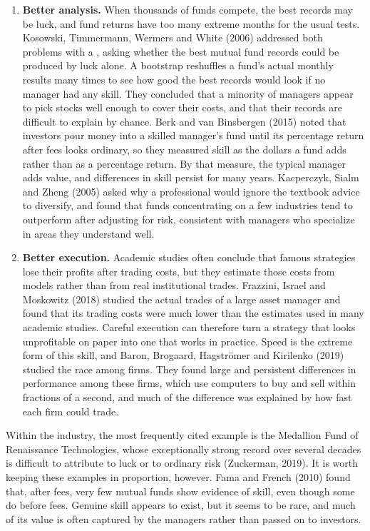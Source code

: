\begin{itemize}
\begin{enumerate}
    \item \textbf{Better analysis.} When thousands of funds compete, the best
  records may be luck, and fund returns have too many extreme months for the
  usual tests. Kosowski, Timmermann, Wermers and White (2006) addressed both
  problems with a , asking whether the best mutual
  fund records could be produced by luck alone. A bootstrap reshuffles a fund's actual monthly
  results many times to see how good the best records would look if no
  manager had any skill. They concluded that a minority of managers appear
  to pick stocks well enough to cover their costs, and that their records are
  difficult to explain by chance. Berk and van Binsbergen (2015) noted that
  investors pour money into a skilled manager's fund until its percentage
  return after fees looks ordinary, so they measured skill as the dollars a
  fund adds rather than as a percentage return. By
  that measure, the typical manager adds value, and differences in skill
  persist for many years. Kacperczyk, Sialm and Zheng (2005) asked why a
  professional would ignore the textbook advice to diversify, and found that
  funds concentrating on a few industries tend to outperform after adjusting for
  risk, consistent with managers who specialize in areas they understand well.

    \item \textbf{Better execution.} Academic studies often conclude that
  famous strategies lose their profits after trading costs, but they estimate
  those costs from models rather than from real institutional trades.
  Frazzini, Israel and Moskowitz (2018) studied the actual trades of a large
  asset manager and found that its trading costs were much lower than the
  estimates used in many academic studies. Careful
  execution can therefore turn a strategy that looks unprofitable on paper
  into one that works in practice. Speed is the extreme form of this
  skill, and Baron, Brogaard, Hagstr\"om{}er and Kirilenko (2019) studied the
  race among  firms. They found large and persistent
  differences in performance among these firms, which use computers to buy and sell
  within fractions of a second, and much of the difference was
  explained by how fast each firm could trade.
  
  \end{enumerate}

  Within the industry, the most frequently cited example is the Medallion
  Fund of Renaissance Technologies, whose exceptionally strong record over
  several decades is difficult to attribute to luck or to ordinary risk
  (Zuckerman, 2019). It is worth keeping these examples in proportion,
  however. Fama and French (2010) found that, after fees, very few mutual
  funds show evidence of skill, even though some do before fees. Genuine
  skill appears to exist, but it seems to be rare, and much of its value is
  often captured by the managers rather than passed on to investors.
  
  
\end{itemize}




